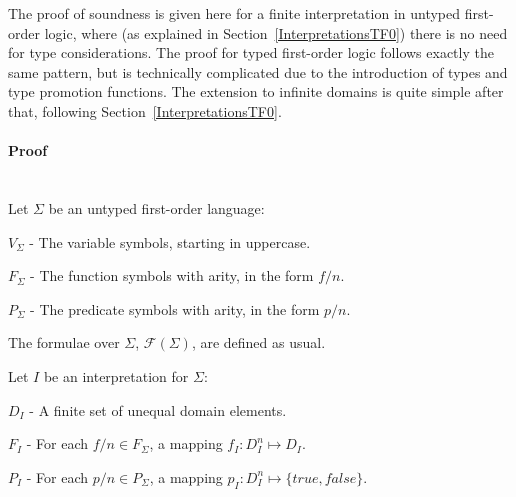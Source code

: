 \documentclass{easychair}
\newenvironment{packed_itemize}{
\vspace*{-0.2em}
\begin{itemize}
\setlength{\partopsep}{0pt}
\setlength{\itemsep}{1pt}
\setlength{\parskip}{0pt}
\setlength{\parsep}{0pt}
}{\end{itemize}}
\newcommand{\true}{{\mathit{true}}}
\newcommand{\false}{{\mathit{false}}}
\begin{document}
The proof of soundness is given here for a finite interpretation in untyped first-order logic, 
where (as explained in Section~\ref{InterpretationsTF0}) there is no need for type considerations.
The proof for typed first-order logic follows exactly the same pattern, but is technically
complicated due to the introduction of types and type promotion functions.
The extension to infinite domains is quite simple after that, following 
Section~\ref{InterpretationsTF0}.

\paragraph{Proof}
~\\
Let $\Sigma$ be an untyped first-order language:
\begin{packed_itemize}
\item $V_\Sigma$ - The variable symbols, starting in uppercase.
\item $F_\Sigma$ - The function symbols with arity, in the form $f/n$.
\item $P_\Sigma$ - The predicate symbols with arity, in the form $p/n$.
\end{packed_itemize}
The formulae over $\Sigma$, $\mathcal{F}(\Sigma)$, are defined as usual. 

\vspace*{1em}
\noindent
Let $I$ be an interpretation for $\Sigma$:
\begin{packed_itemize}
\item $D_I$ - A finite set of unequal domain elements.
\item $F_I$ - For each $f/n \in F_\Sigma$, a mapping $f_I: D_I^n \mapsto D_I$.
\item $P_I$ - For each $p/n \in P_\Sigma$, a mapping $p_I: D_I^n \mapsto \{\true,\false\}$.
\end{packed_itemize}
\end{document}
